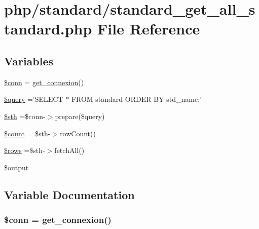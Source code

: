 \hypertarget{standard__get__all__standard_8php}{\section{php/standard/standard\-\_\-get\-\_\-all\-\_\-standard.php File Reference}
\label{standard__get__all__standard_8php}
}
\subsection*{Variables}
\begin{DoxyCompactItemize}
\item 
\hyperlink{standard__get__all__standard_8php_aa8a5a87b9c1a6a0819b88447cbe41877}{\$conn} = \hyperlink{php__functions_8php_ace18bc10f3fd08f92688ac743e0d8c2e}{get\-\_\-connexion}()
\item 
\hyperlink{standard__get__all__standard_8php_af59a5f7cd609e592c41dc3643efd3c98}{\$query} ='S\-E\-L\-E\-C\-T $\ast$ F\-R\-O\-M standard O\-R\-D\-E\-R B\-Y std\-\_\-name;'
\item 
\hyperlink{standard__get__all__standard_8php_afa9126f9664959c02795be300a135f93}{\$sth} =\$conn-\/$>$prepare(\$query)
\item 
\hyperlink{standard__get__all__standard_8php_af789423037bbc89dc7c850e761177570}{\$count} = \$sth-\/$>$row\-Count()
\item 
\hyperlink{standard__get__all__standard_8php_ace2ec39e7df3899fa8df9640ec274b03}{\$rows} =\$sth-\/$>$fetch\-All()
\item 
\hyperlink{standard__get__all__standard_8php_a73004ce9cd673c1bfafd1dc351134797}{\$output}
\end{DoxyCompactItemize}


\subsection{Variable Documentation}
\hypertarget{standard__get__all__standard_8php_aa8a5a87b9c1a6a0819b88447cbe41877}{
\subsubsection[{\$conn}]{\setlength{\rightskip}{0pt plus 5cm}\$conn = {\bf get\-\_\-connexion}()}}\label{standard__get__all__standard_8php_aa8a5a87b9c1a6a0819b88447cbe41877}


